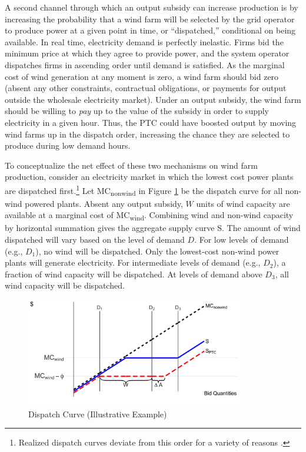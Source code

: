 \documentclass[12pt]{article}
\begin{document}
A second channel through which an output subsidy can increase production is by increasing the probability that a wind farm will be selected by the grid operator to produce power at a given point in time, or ``dispatched,'' conditional on being available. In real time, electricity demand is perfectly inelastic. Firms bid the minimum price at which they agree to provide power, and the system operator dispatches firms in ascending order until demand is satisfied. As the marginal cost of wind generation at any moment is zero, a wind farm should bid zero (absent any other constraints, contractual obligations, or payments for output outside the wholesale electricity market). Under an output subsidy, the wind farm should be willing to \emph{pay} up to the value of the subsidy in order to supply electricity in a given hour. Thus, the PTC could have boosted output by moving wind farms up in the dispatch order, increasing the chance they are selected to produce during low demand hours. 

To conceptualize the net effect of these two mechanisms on wind farm production, consider an electricity market in which the lowest cost power plants are dispatched first.\footnote{Realized dispatch curves deviate from this order for a variety of reasons \citep[see, for example,][]{cicala_imperfect_2017}.} Let MC\textsubscript{nonwind} in Figure \ref{fig:dispatch} be the dispatch curve for all non-wind powered plants. Absent any output subsidy, $W$ units of wind capacity are available at a marginal cost of MC\textsubscript{wind}. Combining wind and non-wind capacity by horizontal summation gives the aggregate supply curve S. The amount of wind dispatched will vary based on the level of demand $D$. For low levels of demand (e.g., $D_1$), no wind will be dispatched. Only the lowest-cost non-wind power plants will generate electricity. For intermediate levels of demand (e.g., $D_2$), a fraction of wind capacity will be dispatched. At levels of demand above $D_3$, all wind capacity will be dispatched.

\begin{figure}[h]
  \centering
  \caption{Dispatch Curve (Illustrative Example)}
  \label{fig:dispatch}
  \includegraphics[width=0.85\textwidth]{dispatch.png}
\end{figure}
\end{document}
